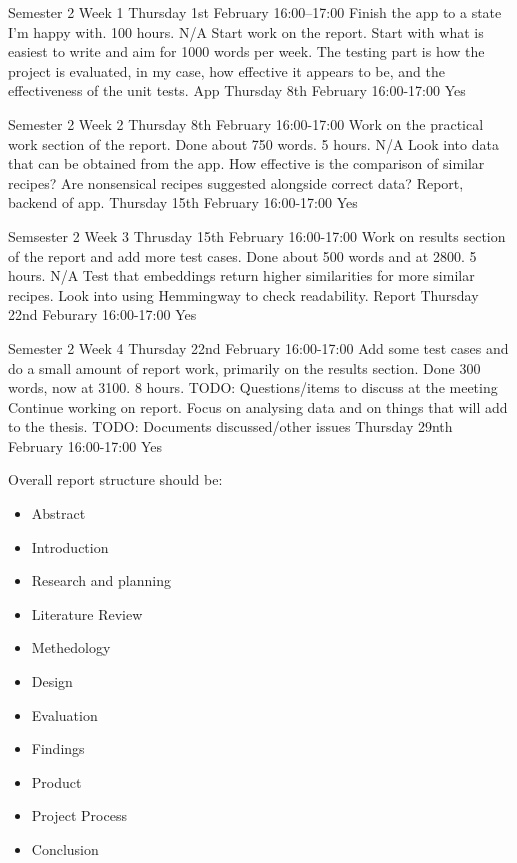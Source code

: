 \documentclass[../CHEFCookingHelperForEveryonesFridge.tex]{subfiles}
\begin{document}
\logbookentry
{Semester 2 Week 1}
{Thursday 1st February 16:00--17:00}
{Finish the app to a state I'm happy with.}
{100 hours.}
{N/A}
{Start work on the report. Start with what is easiest to write and aim for 1000 words
per week. The testing part is how the project is evaluated, in my case, how effective
it appears to be, and the effectiveness of the unit tests.}
{App}
{Thursday 8th February 16:00-17:00}
{Yes}

\logbookentry
{Semester 2 Week 2}
{Thursday 8th February 16:00-17:00}
{Work on the practical work section of the report. Done about 750 words.}
{5 hours.}
{N/A}
{Look into data that can be obtained from the app. How effective is the
comparison of similar recipes? Are nonsensical recipes suggested alongside
correct data?}
{Report, backend of app.}
{Thursday 15th February 16:00-17:00}
{Yes}

\logbookentry
{Semsester 2 Week 3}
{Thrusday 15th February 16:00-17:00}
{Work on results section of the report and add more test cases. Done about 500 words and at 2800.}
{5 hours.}
{N/A}
{Test that embeddings return higher similarities for more similar recipes.
Look into using Hemmingway to check readability.}
{Report}
{Thursday 22nd Feburary  16:00-17:00}
{Yes}

\logbookentry
{Semester 2 Week 4}
{Thursday 22nd February 16:00-17:00}
{Add some test cases and do a small amount of report work, primarily on the results
section. Done 300 words, now at 3100.}
{8 hours.}
{TODO: Questions/items to discuss at the meeting}
{Continue working on report. Focus on analysing data and on things that will add to the thesis.}
{TODO: Documents discussed/other issues}
{Thursday 29nth February 16:00-17:00}
{Yes}

Overall report structure should be:
\begin{itemize}
    \item Abstract
    \item Introduction
    \item Research and planning
    \item Literature Review
    \item Methedology
    \item Design
    \item Evaluation
    \item Findings
    \item Product
    \item Project Process
    \item Conclusion
\end{itemize}
\end{document}
